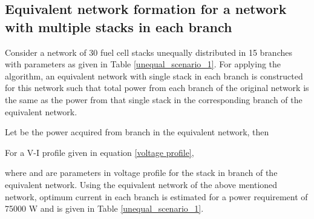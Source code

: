 \documentclass[twocolumn]{autart}
\begin{document}
\subsection{Equivalent network formation for a network with multiple stacks in each branch}
Consider a network of 30 fuel cell stacks unequally distributed in 15 branches with parameters as given in Table \ref{unequal_scenario_1}. For applying the algorithm, an equivalent network with single stack in each branch is constructed for this network such that total power from each branch of the original network is the same as the power from that single stack in the corresponding branch of the equivalent network.

Let  be the power acquired from  branch in the equivalent network, then

For a V-I profile given in equation \eqref{voltage profile}, 

where  and  are parameters in voltage profile for the stack in  branch of the equivalent network. Using the equivalent network of the above mentioned network, optimum current in each branch is estimated for a power requirement of 75000 W and is given in Table \ref{unequal_scenario_1}. 
\end{document}
